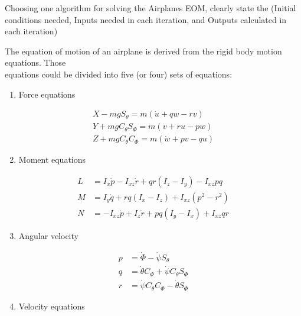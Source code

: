 \documentclass[10pt]{article}
\begin{document}
Choosing one algorithm for solving the Airplanes EOM, clearly state the (Initial conditions needed, Inputs needed in each iteration, and Outputs calculated in each iteration)

The equation of motion of an airplane is derived from the rigid body motion equations. Those\\
equations could be divided into five (or four) sets of equations:

\begin{enumerate}
  \item Force equations
\end{enumerate}

$$
\begin{gathered}
X-m g S_{\theta}=m(\dot{u}+q w-r v) \\
Y+m g C_{\theta} S_{\Phi}=m(\dot{v}+r u-p w) \\
Z+m g C_{\theta} C_{\Phi}=m(\dot{w}+p v-q u)
\end{gathered}
$$

\begin{enumerate}
  \setcounter{enumi}{1}
  \item Moment equations
\end{enumerate}

$$
\begin{aligned}
L & =I_{x} \dot{p}-I_{x z} \dot{r}+q r\left(I_{z}-I_{y}\right)-I_{x z} p q \\
M & =I_{y} \dot{q}+r q\left(I_{x}-I_{z}\right)+I_{x z}\left(p^{2}-r^{2}\right) \\
N & =-I_{x z} \dot{p}+I_{z} \dot{r}+p q\left(I_{y}-I_{x}\right)+I_{x z} q r
\end{aligned}
$$

\begin{enumerate}
  \setcounter{enumi}{2}
  \item Angular velocity
\end{enumerate}

$$
\begin{aligned}
p & =\dot{\Phi}-\dot{\psi} S_{\theta} \\
q & =\dot{\theta} C_{\Phi}+\dot{\psi} C_{\theta} S_{\Phi} \\
r & =\dot{\psi} C_{\theta} C_{\Phi}-\dot{\theta} S_{\Phi}
\end{aligned}
$$

\begin{enumerate}
  \setcounter{enumi}{3}
  \item Velocity equations
\end{enumerate}
\end{document}
